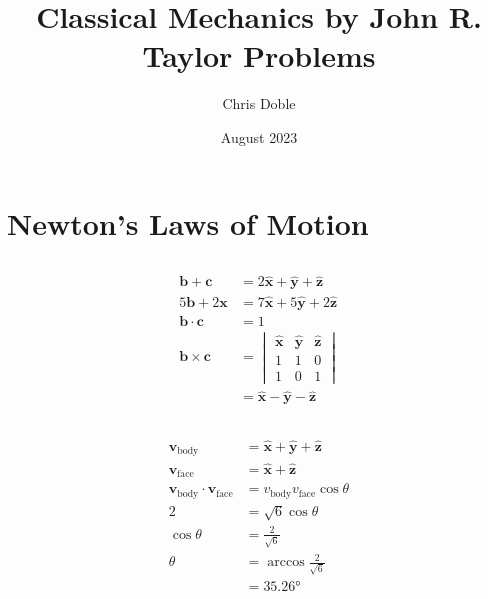 \documentclass{article}
\title{Classical Mechanics by John R. Taylor Problems}
\author{Chris Doble}
\date{August 2023}
\renewcommand{\vec}[1]{\boldsymbol{\mathbf{#1}}}
\newcommand{\uvec}[1]{\hat{\vec{#1}}}
\begin{document}
\maketitle

\tableofcontents

\section{Newton's Laws of Motion}

\subsection{}

\begin{align*}
  \vec{b} + \vec{c}      & = 2 \uvec{x} + \uvec{y} + \uvec{z}     \\
  5 \vec{b} + 2 \vec{x}  & = 7 \uvec{x} + 5 \uvec{y} + 2 \uvec{z} \\
  \vec{b} \cdot \vec{c}  & = 1                                    \\
  \vec{b} \times \vec{c} & = \begin{vmatrix}
                               \uvec{x} & \uvec{y} & \uvec{z} \\
                               1        & 1        & 0        \\
                               1        & 0        & 1
                             \end{vmatrix}       \\
                         & = \uvec{x} - \uvec{y} - \uvec{z}
\end{align*}

\setcounter{subsection}{4}
\subsection{}

\begin{align*}
  \vec{v}_\text{body}                           & = \uvec{x} + \uvec{y} + \uvec{z}          \\
  \vec{v}_\text{face}                           & = \uvec{x} + \uvec{z}                     \\
  \vec{v}_\text{body} \cdot \vec{v}_\text{face} & = v_\text{body} v_\text{face} \cos \theta \\
  2                                             & = \sqrt{6} \cos \theta                    \\
  \cos \theta                                   & = \frac{2}{\sqrt{6}}                      \\
  \theta                                        & = \arccos \frac{2}{\sqrt{6}}              \\
                                                & = \ang{35.26}
\end{align*}
\end{document}

